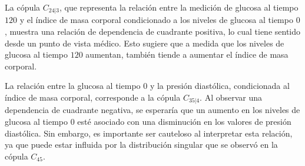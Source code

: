 La cópula $C_{24|3}$, que representa la relación entre la medición de glucosa al tiempo $120$ y el índice de masa corporal condicionado a los niveles de glucosa al tiempo $0$, muestra una relación de dependencia de cuadrante positiva, lo cual tiene sentido desde un punto de vista médico. Esto sugiere que a medida que los niveles de glucosa al tiempo $120$ aumentan, también tiende a aumentar el índice de masa corporal.

La relación entre la glucosa al tiempo $0$ y la presión diastólica, condicionada al índice de masa corporal, corresponde a la cópula $C_{35|4}$. Al observar una dependencia de cuadrante negativa, se esperaría que un aumento en los niveles de glucosa al tiempo $0$ esté asociado con una disminución en los valores de presión diastólica. Sin embargo, es importante ser cauteloso al interpretar esta relación, ya que puede estar influida por la distribución singular que se observó en la cópula $C_{45}$.


\begin{figure}[H]
 \centering
\end{figure}

